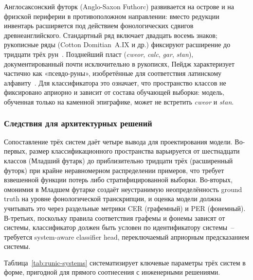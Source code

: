 \documentclass[a4paper,12pt]{extarticle}
\begin{document}
Англосаксонский футорк (Anglo-Saxon Futhorc) развивается на острове и на фризской периферии в противоположном направлении: вместо редукции инвентарь расширяется под действием фонологических сдвигов древнеанглийского. Стандартный ряд включает двадцать восемь знаков; рукописные ряды (Cotton Domitian~A.IX и др.) фиксируют расширение до тридцати трёх рун~\cite{page1999,parsons1999,bammesberger1991}. Позднейший пласт (\textit{cweor\Thorn{}}, \textit{calc}, \textit{gar}, \textit{stan}), документированный почти исключительно в рукописях, Пейдж характеризует частично как «псевдо-руны», изобретённые для соответствия латинскому алфавиту~\cite{page1999,parsons1999}. Для классификатора это означает, что пространство классов не фиксировано априорно и зависит от состава обучающей выборки: модель, обученная только на каменной эпиграфике, может не встретить \textit{cweor\Thorn{}} и \textit{stan}.
 
 
\subsubsection{Следствия для архитектурных решений}
 
Сопоставление трёх систем даёт четыре вывода для проектирования модели. Во-первых, размер классификационного пространства варьируется от шестнадцати классов (Младший футарк) до приблизительно тридцати трёх (расширенный футорк) при крайне неравномерном распределении примеров, что требует взвешенной функции потерь либо стратифицированной выборки. Во-вторых, омонимия в Младшем футарке создаёт неустранимую неопределённость ground truth на уровне фонологической транскрипции, и оценка модели должна учитывать это через раздельные метрики CER (графемный) и PER (фонемный). В-третьих, поскольку правила соответствия графемы и фонемы зависят от системы, классификатор должен быть условен по идентификатору системы~-- требуется system-aware classifier head, переключаемый априорным предсказанием системы.
 
Таблица~\ref{tab:runic-systems} систематизирует ключевые параметры трёх систем в форме, пригодной для прямого соотнесения с инженерными решениями.
 
\end{document}
